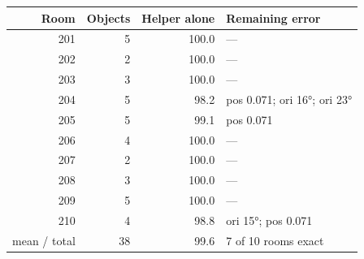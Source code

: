 \begin{tabular}{@{}rrrl@{}}
\toprule
Room & Objects & Helper alone & Remaining error \\
\midrule
201 & 5 & 100.0 & — \\
202 & 2 & 100.0 & — \\
203 & 3 & 100.0 & — \\
204 & 5 & 98.2 & pos 0.071; ori 16°; ori 23° \\
205 & 5 & 99.1 & pos 0.071 \\
206 & 4 & 100.0 & — \\
207 & 2 & 100.0 & — \\
208 & 3 & 100.0 & — \\
209 & 5 & 100.0 & — \\
210 & 4 & 98.8 & ori 15°; pos 0.071 \\
\midrule
mean / total & 38 & 99.6 & 7 of 10 rooms exact \\
\bottomrule
\end{tabular}
